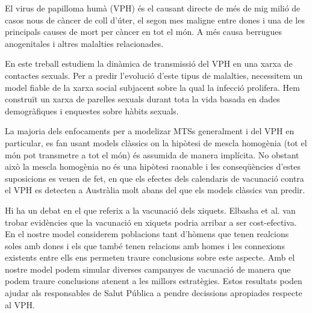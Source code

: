 El virus de papilloma hum\`a (VPH) \'es el causant directe de m\'es de mig mili\'o de casos nous de c\`ancer de coll d'\'uter, el segon mes maligne entre dones i una de les principals causes de mort per c\`ancer en tot el m\'on. A m\'es causa berrugues anogenitales i altres malalties relacionades. 

En este treball estudiem la din\`amica de transmissi\'o del VPH en una xarxa de contactes sexuals. Per a predir l'evoluci\'o d'este tipus de malalties, necessitem un model fiable de la xarxa social subjacent sobre la qual la infecci\'o prolifera. Hem construït un xarxa de parelles sexuals durant tota la vida basada en dades demogr\`afiques i enquestes sobre h\`abits sexuals.

La majoria dels enfocaments per a modelizar MTSs generalment i del VPH en particular, es fan usant models cl\`assics on la hip\`otesi de mescla homog\`enia (tot el m\'on pot transmetre a tot el m\'on) \'es assumida de manera impl\'icita. No obstant aix\`o la mescla homog\`enia no \'es una hip\`otesi raonable i les conseq\"u\`encies d'estes suposicions es veuen de fet, en que els efectes dels calendaris de vacunaci\'o contra el VPH es detecten a Austr\`alia molt abans del que els models cl\`assics van predir.

Hi ha un debat en el que referix a la vacunaci\'o dels xiquets. Elbasha et al. van trobar evid\`encies que la vacunaci\'o en xiquets podria arribar a ser cost-efectiva. En el nostre model considerem poblacions tant d'h\`omens que tenen realcions soles amb dones i els que tamb\'e tenen relacions amb homes i les connexions existents entre ells ens permeten traure conclusions sobre este aspecte. Amb el nostre model podem simular diverses campanyes de vacunaci\'o de manera que podem traure conclusions atenent a les millors estrat\`egies. Estos resultats poden ajudar als responsables de Salut P\'ublica a pendre decissions apropiades respecte al VPH.
